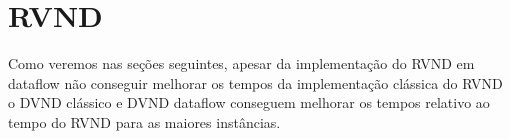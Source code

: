 \section{RVND} \label{sec:resultadosRVND}

Como veremos nas seções seguintes, apesar da implementação do RVND em dataflow não conseguir melhorar os tempos da implementação clássica do RVND o DVND clássico e DVND dataflow conseguem melhorar os tempos relativo ao tempo do RVND para as maiores instâncias.




